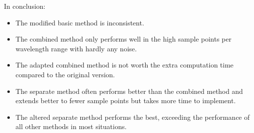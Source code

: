 In conclusion:
\vspace{-.5em}
\begin{itemize}
    \itemsep0em
    \item The modified basic method is inconsistent.
    \item The combined method only performs well in the high sample points per wavelength range with hardly any noise.
    \item The adapted combined method is not worth the extra computation time compared to the original version.
    \item The separate method often performs better than the combined method and extends better to fewer sample points but takes more time to implement.
    \item The altered separate method performs the best, exceeding the performance of all other methods in most situations.
\end{itemize}
